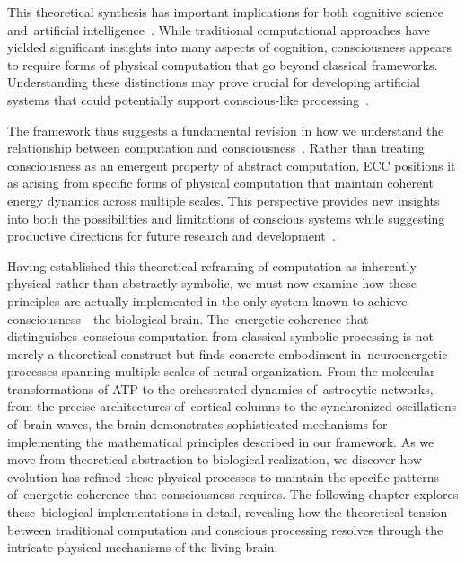 This theoretical synthesis has important implications for both cognitive science and~artificial intelligence~\cite{butlin2023consciousnessartificialintelligenceinsights}. While traditional computational approaches have yielded significant insights into many aspects of cognition, consciousness appears to require forms of physical computation that go beyond classical frameworks. Understanding these distinctions may prove crucial for developing artificial systems that could potentially support conscious-like processing~\cite{seth2024conscious}.

The framework thus suggests a fundamental revision in how we understand the relationship between computation and consciousness~\cite{hunt2024electromagnetic}. Rather than treating consciousness as an emergent property of abstract computation, ECC positions it as arising from specific forms of physical computation that maintain coherent energy dynamics across multiple scales. This perspective provides new insights into both the possibilities and limitations of conscious systems while suggesting productive directions for future research and development~\cite{da2024mathematical}.

Having established this theoretical reframing of computation as inherently physical rather than abstractly symbolic, we must now examine how these principles are actually implemented in the only system known to achieve consciousness—the biological brain. The~energetic coherence that distinguishes~conscious computation from classical symbolic processing is not merely a theoretical construct but finds concrete embodiment in~neuroenergetic processes spanning multiple scales of neural organization. From the molecular transformations of ATP to the orchestrated dynamics of~astrocytic networks, from the precise architectures of~cortical columns to the synchronized oscillations of~brain waves, the brain demonstrates sophisticated mechanisms for implementing the mathematical principles described in our framework. As we move from theoretical abstraction to biological realization, we discover how evolution has refined these physical processes to maintain the specific patterns of~energetic coherence that consciousness requires. The following chapter explores these~biological implementations in detail, revealing how the theoretical tension between traditional computation and conscious processing resolves through the intricate physical mechanisms of the living brain.
